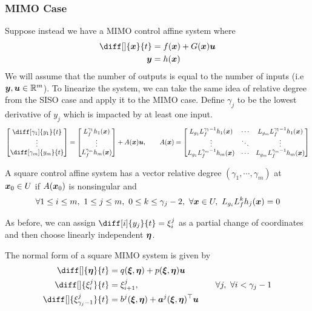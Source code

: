 \subsubsection{MIMO Case}
Suppose instead we have a MIMO control affine system where \[
	\begin{aligned}
		\diff[]{\bs{x}}{t} &= f(\bs{x}) + G(\bs{x})\bs{u}\\
		\bs{y} &= h(\bs{x})
	\end{aligned}
\]
We will assume that the number of outputs is equal to the number of inputs (i.e
$\boldsymbol{y}, \boldsymbol{u} \in \mathbb{R}^m$). To linearize the system, we can take the same idea
of relative degree from the SISO case and apply it to the MIMO case.
Define $\gamma_j$ to be the lowest derivative of $y_j$ which is impacted by at
least one input.\[
	\begin{bmatrix}
		\diff[\gamma_1]{y_1}{t}\\
		\vdots\\
		\diff[\gamma_m]{y_m}{t}
	\end{bmatrix}
	= \begin{bmatrix}
		L_f^{\gamma_1}h_1(\bs{x})\\
		\vdots\\
		L_f^{\gamma_m}h_m(\bs{x})\\
	\end{bmatrix} + A(\bs{x})\bs{u}, \qquad A(\bs{x}) = \begin{bmatrix}
		L_{g_1}L_f^{\gamma_1-1}h_1(\bs{x}) & \cdots &
		L_{g_m}L_f^{\gamma_1-1}h_1(\bs{x})\\
		\vdots & \ddots & \vdots\\
		L_{g_1}L_f^{\gamma_m-1}h_m(\bs{x}) & \cdots &
		L_{g_m}L_f^{\gamma_m-1}h_m(\bs{x})
	\end{bmatrix}
\]
\begin{definition}
	A square control affine system has a vector relative degree $(\gamma_1,
	\cdots, \gamma_m)$ at $\boldsymbol{x}_0\in U$ if $A(\boldsymbol{x}_0)$ is nonsingular and \[
		\forall 1\leq i\leq m,\ 1\leq j \leq m,\ 0 \leq k \leq \gamma_j-2,\ \forall
		\boldsymbol{x}\in U,\ L_{g_i}L_f^kh_j(\boldsymbol{x}) = 0
	\]
	\label{thm:vector-relative-degree}
\end{definition}
As before, we can assign $\diff[i]{y_j}{t} = \xi_i^j$ as a partial change of
coordinates and then choose linearly independent $\boldsymbol{\eta}$.
\begin{definition}
	The normal form of a square MIMO system is given by
	\[
		\begin{aligned}
			\diff[]{\bs{\eta}}{t} &= q(\bs{\xi},\bs{\eta}) + p(\bs{\xi}, \bs{\eta})\bs{u}\\
			\diff[]{\xi_i^j}{t} &= \xi_{i+1}^j, &\quad \forall j,\ \forall i < \gamma_j-1\\
			\diff[]{\xi_{\gamma_j-1}^j}{t} &= b^j(\bs{\xi},\bs{\eta}) +
			\bs{a}^j(\bs{\xi},\bs{\eta})^\top\bs{u}
		\end{aligned}
	\]
	\label{defn:mimo-normal-form}
\end{definition}
